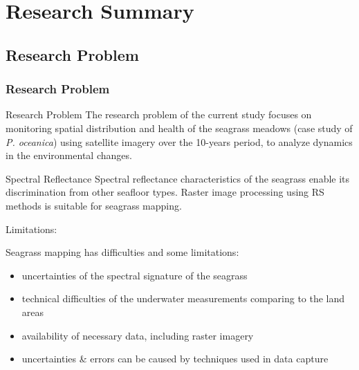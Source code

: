 \documentclass[pdflatex,compress,8pt,
	xcolor={dvipsnames,dvipsnames,svgnames,x11names,table},
	hyperref={colorlinks = true,breaklinks = true, urlcolor = NavyBlue, breaklinks = true}]{beamer}
\begin{document}
\section{Research Summary}

\subsection{Research Problem}
\begin{frame}\frametitle{Research Problem}

\begin{alertblock}{Research Problem}
The research problem of the current study focuses on monitoring spatial distribution and health of the seagrass meadows (case study of \emph{P. oceanica}) using satellite imagery over the 10-years period, to analyze dynamics in the environmental changes.
\end{alertblock}

\begin{block}{Spectral Reflectance}
Spectral reflectance characteristics of the seagrass enable its discrimination from other seafloor types. Raster image processing using RS methods is suitable for seagrass mapping.
\end{block}

\begin{examples}{Limitations:}
\end{examples}
Seagrass mapping has difficulties and some limitations:
\begin{itemize}
	\item uncertainties of the spectral signature of the seagrass
	\item technical difficulties of the underwater measurements comparing to the land areas 
	\item availability of necessary data, including raster imagery
	\item uncertainties \& errors can be caused by techniques used in data capture
\end{itemize}

\end{frame}
\end{document}
